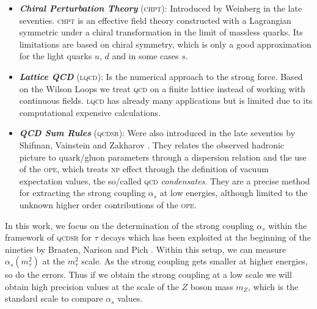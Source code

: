 \documentclass[../../index.tex]{subfiles}
\begin{document}
\begin{itemize}
\item \textbf{\textit{Chiral Perturbation Theory}}
  (\textsc{chpt}):
  Introduced by Weinberg \cite{Weinberg1978} in the late seventies.
  \textsc{chpt} is an effective field theory constructed with a Lagrangian
  symmetric under a chiral transformation in the limit of massless quarks. Its
  limitations are based on chiral symmetry, which is only a good approximation
  for the light quarks \(u\), \(d\) and in some cases \(s\).
\item \textbf{\textit{Lattice QCD}}
  (\textsc{lqcd}):
  Is the numerical approach to the strong force. Based on the Wilson Loops
  \cite{Wilson1974} we treat \textsc{qcd} on a finite lattice instead of working
  with continuous fields. \textsc{lqcd} has already many applications but is
  limited due to its computational expensive calculations.
\item \textbf{\textit{QCD Sum Rules}}
  (\textsc{qcdsr}): Were also introduced in the late seventies by Shifman, Vainstein and
  Zakharov \cite{Shifman1978,Shifman1978a}. They relates the observed hadronic
  picture to quark\-/gluon parameters through a dispersion relation and the use
  of the \textsc{ope}, which treats \textsc{np} effect through the definition of
  vacuum expectation values, the so\-/called \textsc{qcd} \textit{condensates}.
  They are a precise method for extracting the strong coupling \(\alpha_s\) at low
  energies, although limited to the unknown higher order contributions of the
  \textsc{ope}.
\end{itemize}


In this work, we focus on the determination of the strong coupling \(\alpha_s\)
within the framework of \textsc{qcdsr} for \(\tau\) decays which has been
exploited at the beginning of the nineties by Braaten, Narison and Pich
\cite{Braaten1991}. Within this setup, we can measure \(\alpha_s(m_\tau^2)\) at
the \(m_\tau^2\) scale. As the strong coupling gets smaller at higher energies,
so do the errors. Thus if we obtain the strong coupling at a low scale we will
obtain high precision values at the scale of the \(Z\) boson mass \(m_Z\), which
is the standard scale to compare \(\alpha_s\) values.
\end{document}
